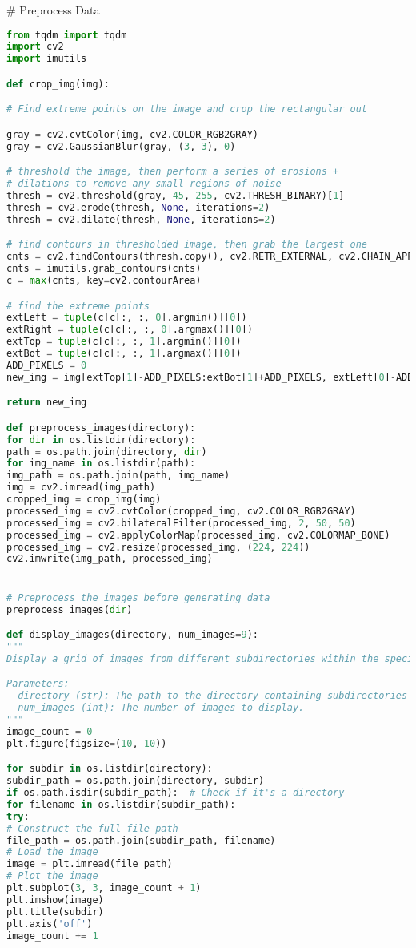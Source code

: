 # Preprocess Data
\begin{lstlisting}[language=Python]
from tqdm import tqdm
import cv2
import imutils

def crop_img(img):

# Find extreme points on the image and crop the rectangular out

gray = cv2.cvtColor(img, cv2.COLOR_RGB2GRAY)
gray = cv2.GaussianBlur(gray, (3, 3), 0)

# threshold the image, then perform a series of erosions +
# dilations to remove any small regions of noise
thresh = cv2.threshold(gray, 45, 255, cv2.THRESH_BINARY)[1]
thresh = cv2.erode(thresh, None, iterations=2)
thresh = cv2.dilate(thresh, None, iterations=2)

# find contours in thresholded image, then grab the largest one
cnts = cv2.findContours(thresh.copy(), cv2.RETR_EXTERNAL, cv2.CHAIN_APPROX_SIMPLE)
cnts = imutils.grab_contours(cnts)
c = max(cnts, key=cv2.contourArea)

# find the extreme points
extLeft = tuple(c[c[:, :, 0].argmin()][0])
extRight = tuple(c[c[:, :, 0].argmax()][0])
extTop = tuple(c[c[:, :, 1].argmin()][0])
extBot = tuple(c[c[:, :, 1].argmax()][0])
ADD_PIXELS = 0
new_img = img[extTop[1]-ADD_PIXELS:extBot[1]+ADD_PIXELS, extLeft[0]-ADD_PIXELS:extRight[0]+ADD_PIXELS].copy()

return new_img

def preprocess_images(directory):
for dir in os.listdir(directory):
path = os.path.join(directory, dir)
for img_name in os.listdir(path):
img_path = os.path.join(path, img_name)
img = cv2.imread(img_path)
cropped_img = crop_img(img)
processed_img = cv2.cvtColor(cropped_img, cv2.COLOR_RGB2GRAY)
processed_img = cv2.bilateralFilter(processed_img, 2, 50, 50)
processed_img = cv2.applyColorMap(processed_img, cv2.COLORMAP_BONE)
processed_img = cv2.resize(processed_img, (224, 224))
cv2.imwrite(img_path, processed_img)


# Preprocess the images before generating data
preprocess_images(dir)

def display_images(directory, num_images=9):
"""
Display a grid of images from different subdirectories within the specified directory.

Parameters:
- directory (str): The path to the directory containing subdirectories of images.
- num_images (int): The number of images to display.
"""
image_count = 0
plt.figure(figsize=(10, 10))

for subdir in os.listdir(directory):
subdir_path = os.path.join(directory, subdir)
if os.path.isdir(subdir_path):  # Check if it's a directory
for filename in os.listdir(subdir_path):
try:
# Construct the full file path
file_path = os.path.join(subdir_path, filename)
# Load the image
image = plt.imread(file_path)
# Plot the image
plt.subplot(3, 3, image_count + 1)
plt.imshow(image)
plt.title(subdir)
plt.axis('off')
image_count += 1


\end{lstlisting}
